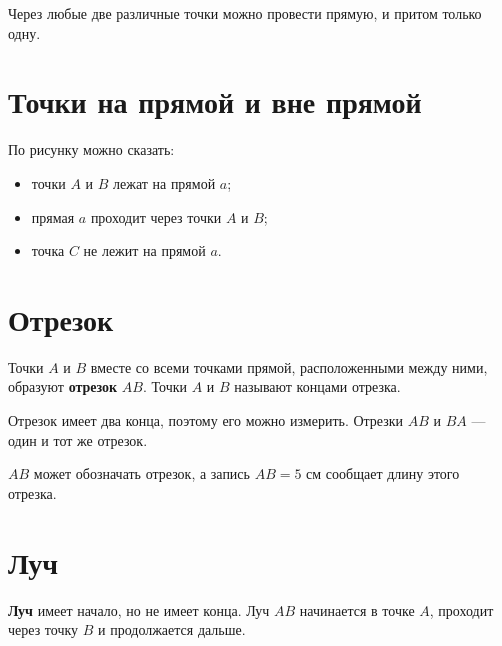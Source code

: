 \begin{propertybox}
  Через любые две различные точки можно провести прямую, и притом только
  одну.
\end{propertybox}

\section{Точки на прямой и вне прямой}

\incidenceexamplefigure

По рисунку можно сказать:
\begin{itemize}
  \item точки \(A\) и \(B\) лежат на прямой \(a\);
  \item прямая \(a\) проходит через точки \(A\) и \(B\);
  \item точка \(C\) не лежит на прямой \(a\).
\end{itemize}

\section{Отрезок}

\begin{propertybox}[Определение]
  Точки \(A\) и \(B\) вместе со всеми точками прямой, расположенными между
  ними, образуют \textbf{отрезок} \(AB\). Точки \(A\) и \(B\) называют
  концами отрезка.
\end{propertybox}

\segmentexamplefigure

Отрезок имеет два конца, поэтому его можно измерить. Отрезки \(AB\) и
\(BA\) — один и тот же отрезок.

\begin{warningbox}
  \(AB\) может обозначать отрезок, а запись \(AB=5\text{ см}\) сообщает
  длину этого отрезка.
\end{warningbox}

\section{Луч}

\begin{propertybox}[Определение]
  \textbf{Луч} имеет начало, но не имеет конца. Луч \(AB\) начинается в
  точке \(A\), проходит через точку \(B\) и продолжается дальше.
\end{propertybox}

\rayexamplefigure

